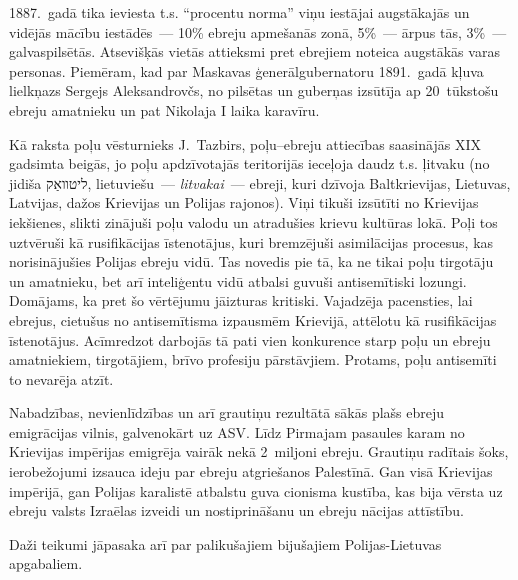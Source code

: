 \documentclass[twoside,a5paper,12pt,fleqn,openany]{extbook}
\newcommand{\lttxti}[1]{\textit{\textlithuanian{#1}}}
\newcommand{\hetxti}[1]{\texthebrew{#1}}
\begin{document}
1887.~gadā tika ieviesta t.s. ``procentu norma'' viņu iestājai augstākajās un vidējās mācību iestādēs~--- 10\% ebreju apmešanās zonā, 5\%~--- ārpus tās, 3\%~--- galvaspilsētās. Atsevišķās vietās attieksmi pret ebrejiem noteica augstākās varas personas. Piemēram, kad par Maskavas ģenerālgubernatoru 1891.~gadā kļuva lielkņazs Sergejs Aleksandrovčs, no pilsētas un guberņas izsūtīja ap 20~tūkstošu ebreju amatnieku un pat Nikolaja I laika karavīru.

Kā raksta poļu vēsturnieks J.~Tazbirs, poļu--ebreju attiecības saasinājās XIX gadsimta beigās, jo poļu apdzīvotajās teritorijās ieceļoja daudz t.s. ļitvaku (no jidiša \hetxti{ליטװאַק}, lietuviešu~--- \lttxti{litvakai}~--- ebreji, kuri dzīvoja Baltkrievijas, Lietuvas, Latvijas, dažos Krievijas un Polijas rajonos). Viņi tikuši izsūtīti no Krievijas iekšienes, slikti zinājuši poļu valodu un atradušies krievu kultūras lokā. Poļi tos uztvēruši kā rusifikācijas īstenotājus, kuri bremzējuši asimilācijas procesus, kas norisinājušies Polijas ebreju vidū. Tas novedis pie tā, ka ne tikai poļu tirgotāju un amatnieku, bet arī inteliģentu vidū atbalsi guvuši antisemītiski lozungi. Domājams, ka pret šo vērtējumu jāizturas kritiski. Vajadzēja pacensties, lai ebrejus, cietušus no antisemītisma izpausmēm Krievijā, attēlotu kā rusifikācijas īstenotājus. Acīmredzot darbojās tā pati vien konkurence starp poļu un ebreju amatniekiem, tirgotājiem, brīvo profesiju pārstāvjiem. Protams, poļu antisemīti to nevarēja atzīt.

Nabadzības, nevienlīdzības un arī grautiņu rezultātā sākās plašs ebreju emigrācijas vilnis, galvenokārt uz ASV. Līdz Pirmajam pasaules karam no Krievijas impērijas emigrēja vairāk nekā 2~miljoni ebreju. Grautiņu radītais šoks, ierobežojumi izsauca ideju par ebreju atgriešanos Palestīnā. Gan visā Krievijas impērijā, gan Polijas karalistē atbalstu guva cionisma kustība, kas bija vērsta uz ebreju valsts Izraēlas izveidi un nostiprināšanu un ebreju nācijas attīstību.

Daži teikumi jāpasaka arī par  palikušajiem bijušajiem Polijas-Lietuvas apgabaliem.
\end{document}
